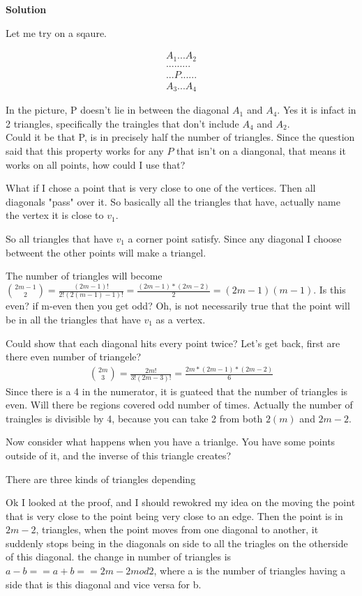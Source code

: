 \documentclass[12pt,tikz,border=10pt]{article}
\theoremstyle{definition}
\theoremstyle{remark}
\begin{document}
\textbf{Solution}

Let me try on a sqaure.

\begin{align*}
        A_1  ... A_2\\
        ...  ...  ... \\
        ... P... ...\\
        A_3 ... A_4
\end{align*}

In the picture, P doesn't lie in between the diagonal $A_{1}$ and $A_{4}$.
Yes it is infact in 2 triangles, specifically the traingles that don't include $A_4$ and $A_2$. \\

Could it be that P, is in precisely half the number of triangles. Since the 
question said that this property works for any $P$ that isn't on a diangonal, that means
it works on all points, how could I use that?

What if I chose a point that is very close to one of the vertices. Then all diagonals
"pass" over it. So basically all the triangles that have, actually name the vertex it is close to $v_1$.

So all triangles that have $v_1$ a corner point satisfy. Since any diagonal I choose betweent the other points will make a triangel.

The number of triangles will become $\binom{2m-1}{2}=\frac{(2m-1)!}{2!(2(m-1)-1)!}=\frac{(2m-1)*(2m-2)}{2}=(2m-1)(m-1)$. 
Is this even? if m-even then you get odd? Oh, is not necessarily true that 
the point will be in all the triangles that have $v_1$ as a vertex.

Could show that each diagonal hits every point twice?
Let's get back, first are there even number of triangele?
\begin{align*}
    \binom{2m}{3}=\frac{2m!}{3!(2m-3)!}=\frac{2m*(2m-1)*(2m-2)}{6}
\end{align*}
Since there is a 4 in the numerator, it is guateed that the number of triangles is even.
Will there be regions covered odd number of times. Actually the number of traingles is
divisible by 4, because you can take 2 from both $2(m)$ and $2m-2$.

Now consider what happens when you have a trianlge. You have some points outside of it, and 
the inverse of this triangle creates?

There are three kinds of triangles depending 

Ok I looked at the proof, and I should rewokred my idea on the moving the point that is very 
close to the point being very close to an edge. 
Then the point is in $2m-2$, triangles, when the point moves from one diagonal 
to another, it suddenly stops being in the diagonals on side to all the triagles on the otherside of this diagonal.
the change in number of triangles is $a-b==a+b==2m-2 mod 2$, where a is the number of triangles having a side that is this diagonal and 
vice versa for b. 
\end{document}
